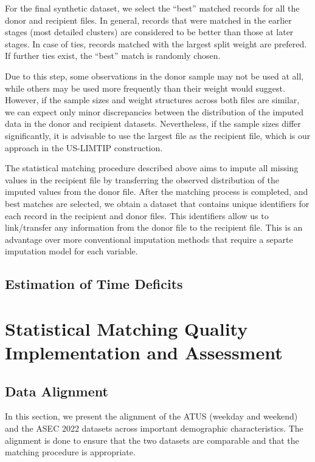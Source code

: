 \documentclass[
  11pt,
]{article}
\begin{document}
For the final synthetic dataset, we select the ``best'' matched records
for all the donor and recipient files. In general, records that were
matched in the earlier stages (most detailed clusters) are considered to
be better than those at later stages. In case of ties, records matched
with the largest split weight are prefered. If further ties exist, the
``best'' match is randomly chosen.

Due to this step, some observations in the donor sample may not be used
at all, while others may be used more frequently than their weight would
suggest. However, if the sample sizes and weight structures across both
files are similar, we can expect only minor discrepancies between the
distribution of the imputed data in the donor and recipient datasets.
Nevertheless, if the sample sizes differ significantly, it is advisable
to use the largest file as the recipient file, which is our approach in
the US-LIMTIP construction.

The statistical matching procedure described above aims to impute all
missing values in the recipient file by transferring the observed
distribution of the imputed values from the donor file. After the
matching process is completed, and best matches are selected, we obtain
a dataset that contains unique identifiers for each record in the
recipient and donor files. This identifiers allow us to link/transfer
any information from the donor file to the recipient file. This is an
advantage over more conventional imputation methods that require a
separte imputation model for each variable.

\subsection{Estimation of Time
Deficits}\label{estimation-of-time-deficits}

\section{Statistical Matching Quality Implementation and
Assessment}\label{statistical-matching-quality-implementation-and-assessment}

\subsection{Data Alignment}\label{data-alignment}

In this section, we present the alignment of the ATUS (weekday and
weekend) and the ASEC 2022 datasets across important demographic
characteristics. The alignment is done to ensure that the two datasets
are comparable and that the matching procedure is appropriate.
\end{document}

